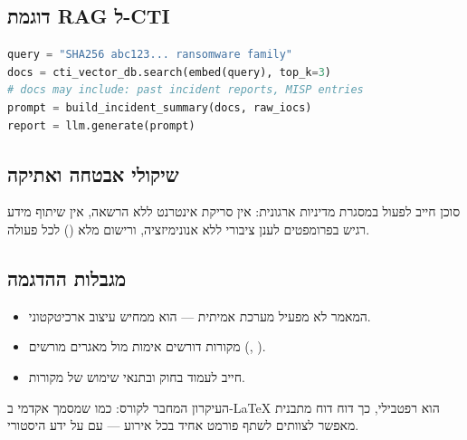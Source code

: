 
\subsection{דוגמת RAG ל-CTI}

\begin{lstlisting}[language=Python,caption={שליפת הקשר לחקירת כופר}]
query = "SHA256 abc123... ransomware family"
docs = cti_vector_db.search(embed(query), top_k=3)
# docs may include: past incident reports, MISP entries
prompt = build_incident_summary(docs, raw_iocs)
report = llm.generate(prompt)
\end{lstlisting}

\subsection{שיקולי אבטחה ואתיקה}

\begin{warningbox}
סוכן  חייב לפעול במסגרת מדיניות ארגונית: אין סריקת אינטרנט
ללא הרשאה, אין שיתוף מידע רגיש בפרומפטים לענן ציבורי ללא אנונימיזציה,
ורישום מלא () לכל פעולה.
\end{warningbox}

\subsection{מגבלות ההדגמה}

\begin{itemize}[rightmargin=2em]
  \item המאמר לא מפעיל מערכת אמיתית --- הוא ממחיש עיצוב ארכיטקטוני.
  \item מקורות  דורשים אימות מול מאגרים מורשים (, ).
  \item {} חייב לעמוד בחוק ובתנאי שימוש של מקורות.
\end{itemize}

\begin{insightbox}
העיקרון המחבר לקורס: כמו שמסמך אקדמי ב-\LaTeX{} הוא רפטבילי, כך דוח
דוח  מתבנית  מאפשר לצוותים לשתף פורמט אחיד
בכל אירוע --- עם  על ידע היסטורי.
\end{insightbox}
